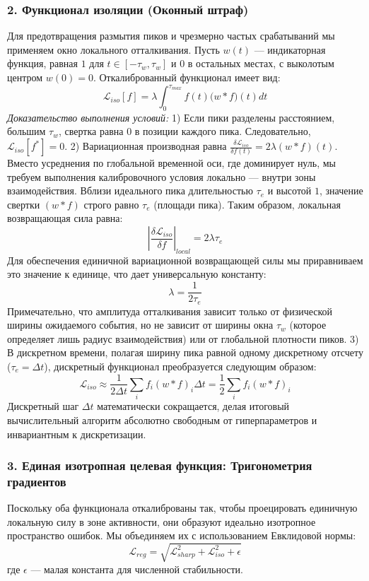 \documentclass[11pt,a4paper]{article}
\begin{document}
\subsubsection*{2. Функционал изоляции (Оконный штраф)}
Для предотвращения размытия пиков и чрезмерно частых срабатываний мы применяем окно локального отталкивания. Пусть $w(t)$ — индикаторная функция, равная $1$ для $t \in [-\tau_w, \tau_w]$ и $0$ в остальных местах, с выколотым центром $w(0)=0$. Откалиброванный функционал имеет вид:
\begin{equation}
\mathcal{L}_{iso}[f] = \lambda \int_{0}^{\tau_{max}} f(t) \big(w * f\big)(t) dt
\end{equation}
\textit{Доказательство выполнения условий:}
1) Если пики разделены расстоянием, большим $\tau_w$, свертка равна $0$ в позиции каждого пика. Следовательно, $\mathcal{L}_{iso}[f^*] = 0$.
2) Вариационная производная равна $\frac{\delta \mathcal{L}_{iso}}{\delta f(t)} = 2\lambda (w * f)(t)$. Вместо усреднения по глобальной временной оси, где доминирует нуль, мы требуем выполнения калибровочного условия локально — внутри зоны взаимодействия. Вблизи идеального пика длительностью $\tau_e$ и высотой $1$, значение свертки $(w * f)$ строго равно $\tau_e$ (площади пика). Таким образом, локальная возвращающая сила равна:
\begin{equation}
\left| \frac{\delta \mathcal{L}_{iso}}{\delta f} \right|_{local} = 2\lambda \tau_e
\end{equation}
Для обеспечения единичной вариационной возвращающей силы мы приравниваем это значение к единице, что дает универсальную константу:
\begin{equation}
\lambda = \frac{1}{2\tau_e}
\end{equation}
Примечательно, что амплитуда отталкивания зависит только от физической ширины ожидаемого события, но не зависит от ширины окна $\tau_w$ (которое определяет лишь радиус взаимодействия) или от глобальной плотности пиков.
3) В дискретном времени, полагая ширину пика равной одному дискретному отсчету ($\tau_e = \Delta t$), дискретный функционал преобразуется следующим образом:
\begin{equation}
\mathcal{L}_{iso} \approx \frac{1}{2\Delta t} \sum_{i} f_i (w * f)_i \Delta t = \frac{1}{2} \sum_{i} f_i (w * f)_i
\end{equation}
Дискретный шаг $\Delta t$ математически сокращается, делая итоговый вычислительный алгоритм абсолютно свободным от гиперпараметров и инвариантным к дискретизации.

\subsubsection*{3. Единая изотропная целевая функция: Тригонометрия градиентов}
Поскольку оба функционала откалиброваны так, чтобы проецировать единичную локальную силу в зоне активности, они образуют идеально изотропное пространство ошибок. Мы объединяем их с использованием Евклидовой нормы:
\begin{equation}
\mathcal{L}_{reg} = \sqrt{\mathcal{L}_{sharp}^2 + \mathcal{L}_{iso}^2 + \epsilon}
\end{equation}
где $\epsilon$ — малая константа для численной стабильности.
\end{document}
